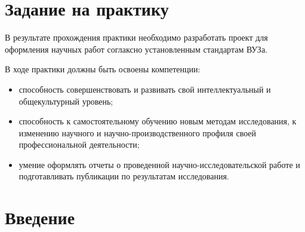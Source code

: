 \section{Задание на практику}
	В результате прохождения практики необходимо разработать проект для оформления
		научных работ соглаксно установленным стандартам ВУЗа.

	В ходе практики должны быть освоены компетенции:
		\begin{itemize}
			\item способность совершенствовать и развивать свой интеллектуальный и общекультурный уровень;
			\item способность к самостоятельному обучению новым методам исследования, к изменению научного и научно-производственного профиля своей профессиональной деятельности;
			\item умение оформлять отчеты о проведенной научно-исследовательской работе и подготавливать публикации по результатам исследования.
		\end{itemize}

\newpage
\section{Введение}
